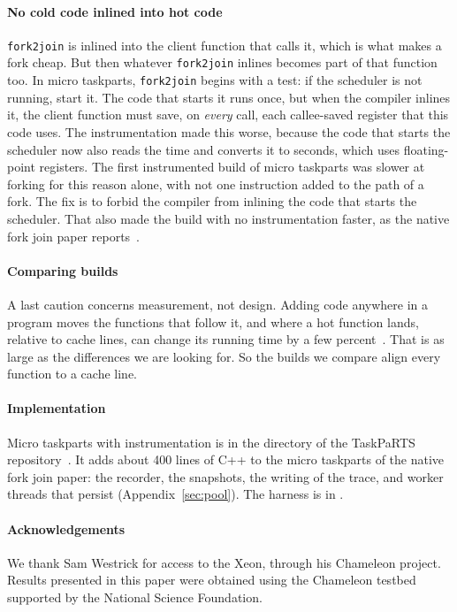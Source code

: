 \documentclass[sigplan,nonacm]{acmart}
\begin{document}
\paragraph{No cold code inlined into hot code}
%
\lstinline|fork2join| is inlined into the client function that calls
it, which is what makes a fork cheap.
%
But then whatever \lstinline|fork2join| inlines becomes part of that
function too.
%
In micro taskparts, \lstinline|fork2join| begins with a test: if the
scheduler is not running, start it.
%
The code that starts it runs once, but when the compiler inlines it,
the client function must save, on \emph{every} call, each callee-saved
register that this code uses.
%
The instrumentation made this worse, because the code that starts the
scheduler now also reads the time and converts it to seconds, which
uses floating-point registers.
%
The first instrumented build of micro taskparts was slower at forking
for this reason alone, with not one instruction added to the path of a
fork.
%
The fix is to forbid the compiler from inlining the code that starts
the scheduler.
%
That also made the build with no instrumentation faster, as the
native fork join paper reports~\cite{nativeforkjoin}.

\paragraph{Comparing builds}
%
A last caution concerns measurement, not design.
%
Adding code anywhere in a program moves the functions that follow it,
and where a hot function lands, relative to cache lines, can change
its running time by a few percent~\cite{mytkowicz2009wrong}.
%
That is as large as the differences we are looking for.
%
So the builds we compare align every function to a cache line.

\paragraph{Implementation}
%
Micro taskparts with instrumentation is in the directory
 of the TaskPaRTS
repository~\cite{taskparts}.
%
It adds about 400 lines of C++ to the micro taskparts of the native
fork join paper: the recorder, the snapshots, the writing of the trace,
and worker threads that persist (Appendix~\ref{sec:pool}).
%
The harness is in .

\paragraph{Acknowledgements}
%
We thank Sam Westrick for access to the Xeon, through his Chameleon
project.
%
Results presented in this paper were obtained using the Chameleon
testbed~\cite{keahey2020lessons} supported by the National Science
Foundation.
\end{document}
